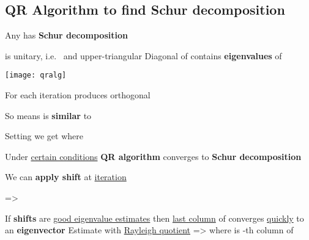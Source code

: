 \subsection*{\texorpdfstring{QR Algorithm to find Schur decomposition
            }{QR Algorithm to find Schur decomposition }}


Any  has 
\textbf{Schur decomposition} 
\begin{itemize}

      \vItem
             is unitary, i.e.~ and
            upper-triangular 
      \vItem
            Diagonal of  contains \textbf{eigenvalues} of 
\end{itemize}

\hSep %

\texttt{[image: qralg]}

\begin{itemize}

      \vItem For  each iteration
             produces orthogonal

      \vItem So 
            means  is \textbf{similar} to 

      \vItem Setting  we get
             where
      
      \vItem Under \ul{certain conditions} \textbf{QR algorithm} converges to
            \textbf{Schur decomposition}
\end{itemize}

\hSep %

We can \textbf{apply shift}  at \ul{iteration} 

=> 
\begin{itemize}

      \vItem
            If \textbf{shifts} are \ul{good eigenvalue estimates} then \ul{last column} of
             converges \ul{quickly} to an \textbf{eigenvector}
      \vItem
            Estimate  with \ul{Rayleigh quotient} =>
            where  is -th column of

\end{itemize}